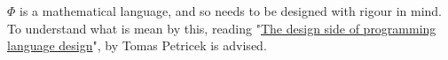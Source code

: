\documentclass[../main.tex]{subfiles}
\begin{document}
    $\Phi$ is a mathematical language, and so needs to be designed with rigour in mind.
    To understand what is mean by this, reading "\href{http://tomasp.net/blog/2017/design-side-of-pl/}{The design side of programming language design}", by Tomas Petricek is advised.
\end{document}
